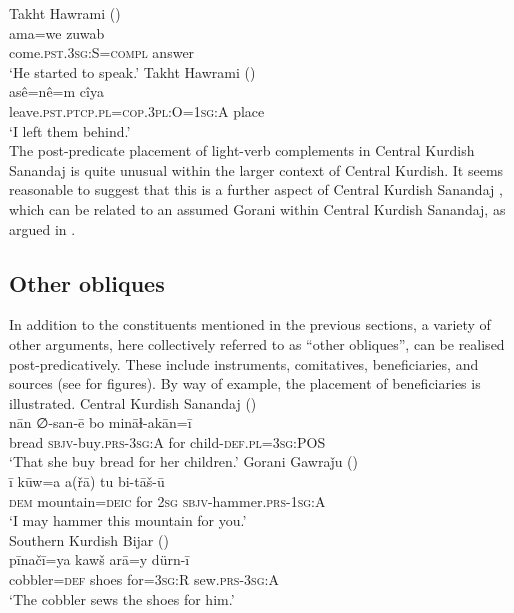 \documentclass[output=paper,colorlinks,citecolor=brown]{langscibook}
\begin{document}
\begin{sloppypar}
\ea
\ea\label{MGKC:ex:24a}
Takht Hawrami (\citealt[HB.31]{mohammadirad_takht_nodate}) \\
\gll ama=we zuwab \\
come\textsc{.pst.3sg:S=compl} answer \\
\glt `He started to speak.'
\ex\label{MGKC:ex:24b}
Takht Hawrami (\citealt[ŽM.27]{mohammadirad_takht_nodate}) \\
\gll asê=nê=m cîya \\
leave\textsc{.pst.ptcp.pl=cop.3pl:O=1sg:A} place \\
\glt `I left them behind.' \\
\z
\z 
The post-predicate placement of light-verb complements in Central Kurdish Sanandaj is quite unusual within the larger context of Central Kurdish. It seems reasonable to suggest that this is a further aspect of Central Kurdish Sanandaj , which can be related to an assumed 
 Gorani  within Central Kurdish Sanandaj, as argued in 
 \citet{mohammadirad_gorani_inpress}.

\subsection{Other obliques}
In addition to the constituents mentioned in the previous sections, a variety of other  arguments, here collectively referred to as “other obliques”, can be realised post-predicatively. These include instruments, comitatives, beneficiaries, and sources (see  for figures). By way of example, the placement of beneficiaries is illustrated.
\ea
\ea\label{MGKC:ex:25a}
Central Kurdish Sanandaj (\citealt[C, 0355]{mohammadirad_Sanandaj_Kurdish_2022}) \\
\gll nān ∅-san-ē bo mināɫ-akān=ī \\
bread \textsc{sbjv-}buy\textsc{.prs-3sg:A} for child-\textsc{def.pl=3sg:POS} \\
\glt `That she buy bread for her children.'
\ex\label{MGKC:ex:25b}
Gorani Gawraǰu (\citealt[D, 0592]{mohammadirad_gorani_2022}) \\
\gll ī kūw=a a(řā) tu bi-tāš-ū \\
\textsc{dem} mountain=\textsc{deic} for \textsc{2sg} \textsc{sbjv}-hammer\textsc{.prs-1sg:A} \\
\glt `I may hammer this mountain for you.' \\
\ex\label{MGKC:ex:25c}
Southern Kurdish Bijar (\citealt[A, 0072]{mohammadirad_Bijar_Kurdish_2022}) \\
\gll pīnačī=ya kawš arā=y dürn-ī\\
cobbler=\textsc{def} shoes for=\textsc{3sg:R} sew.\textsc{prs-3sg:A} \\
\glt `The cobbler sews the shoes for him.'
\z
\z 


\end{sloppypar}
\end{document}
